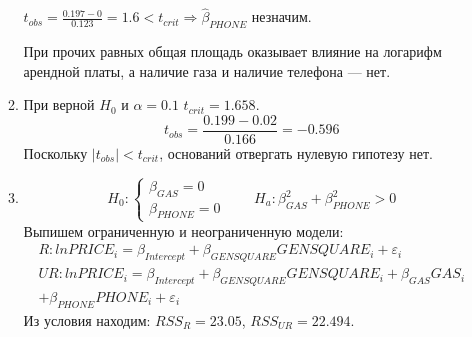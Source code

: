 \begin{enumerate}
\begin{enumerate}
$t_{obs} = \frac{0.197 - 0}{0.123} = 1.6 < t_{crit} \Rightarrow \hat \beta_{PHONE}$ незначим.

При прочих равных общая площадь оказывает влияние на логарифм арендной платы,
а наличие газа и наличие телефона — нет.
\item При верной $H_0$ и $\alpha = 0.1$ $t_{crit} = 1.658$.
\[
t_{obs} = \frac{0.199 - 0.02}{0.166} = -0.596
\]
Поскольку $|t_{obs}| < t_{crit}$, оснований отвергать нулевую гипотезу нет.
\item
\[H_0:
\begin{cases}
  \beta_{GAS} = 0 \\
  \beta_{PHONE} = 0
\end{cases}
\qquad
H_a: \beta_{GAS}^2 + \beta_{PHONE}^2 > 0
\]
Выпишем ограниченную и неограниченную модели:
\begin{multline*}
R: lnPRICE_i = \beta_{Intercept} + \beta_{GENSQUARE} GENSQUARE_i + \varepsilon_i \\
UR: lnPRICE_i = \beta_{Intercept} + \beta_{GENSQUARE} GENSQUARE_i + \beta_{GAS} GAS_i \\
+ \beta_{PHONE} PHONE_i + \varepsilon_i
\end{multline*}
Из условия находим: $RSS_{R} = 23.05$, $RSS_{UR} = 22.494$.


\end{enumerate}
\end{enumerate}
